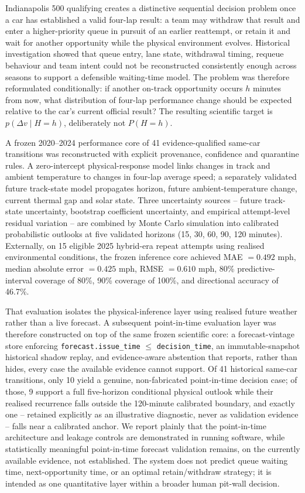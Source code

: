 Indianapolis 500 qualifying creates a distinctive sequential decision problem once a car has established a
valid four-lap result: a team may withdraw that result and enter a higher-priority queue in pursuit of an
earlier reattempt, or retain it and wait for another opportunity while the physical environment evolves.
Historical investigation showed that queue entry, lane state, withdrawal timing, requeue behaviour and team
intent could not be reconstructed consistently enough across seasons to support a defensible waiting-time
model. The problem was therefore reformulated conditionally: if another on-track opportunity occurs $h$
minutes from now, what distribution of four-lap performance change should be expected relative to the
car's current official result? The resulting scientific target is $p(\Delta v \mid H=h)$, deliberately not
$P(H=h)$.

A frozen 2020--2024 performance core of 41 evidence-qualified same-car transitions was reconstructed with
explicit provenance, confidence and quarantine rules. A zero-intercept physical-response model links changes
in track and ambient temperature to changes in four-lap average speed; a separately validated future
track-state model propagates horizon, future ambient-temperature change, current thermal gap and solar
state. Three uncertainty sources -- future track-state uncertainty, bootstrap coefficient uncertainty, and
empirical attempt-level residual variation -- are combined by Monte Carlo simulation into calibrated
probabilistic outlooks at five validated horizons (15, 30, 60, 90, 120 minutes). Externally, on 15 eligible
2025 hybrid-era repeat attempts using realised environmental conditions, the frozen inference core achieved
MAE $=0.492$ mph, median absolute error $=0.425$ mph, RMSE $=0.610$ mph, 80\% predictive-interval
coverage of 80\%, 90\% coverage of 100\%, and directional accuracy of 46.7\%.

That evaluation isolates the physical-inference layer using realised future weather rather than a live forecast.
A subsequent point-in-time evaluation layer was therefore constructed on top of the same frozen scientific
core: a forecast-vintage store enforcing \texttt{forecast.issue\_time} $\le$ \texttt{decision\_time}, an
immutable-snapshot historical shadow replay, and evidence-aware abstention that reports, rather than hides,
every case the available evidence cannot support. Of 41 historical same-car transitions, only 10 yield a
genuine, non-fabricated point-in-time decision case; of those, 9 support a full five-horizon conditional
physical outlook while their realised recurrence falls outside the 120-minute calibrated boundary, and exactly
one -- retained explicitly as an illustrative diagnostic, never as validation evidence -- falls near a calibrated
anchor. We report plainly that the point-in-time architecture and leakage controls are demonstrated in
running software, while statistically meaningful point-in-time forecast validation remains, on the currently
available evidence, not established. The system does not predict queue waiting time, next-opportunity time,
or an optimal retain/withdraw strategy; it is intended as one quantitative layer within a broader human
pit-wall decision.

